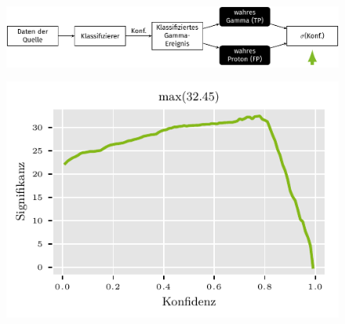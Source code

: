 \documentclass[aspectratio=1610, professionalfonts, 9pt]{beamer}
\begin{document}
\begin{frame}
  \begin{minipage}[t][0.25\textheight][t]{\textwidth}
	\begin{figure}
	  \includegraphics[scale=0.5]{./tikz/Conf/Conf4.pdf}
	\end{figure}
  \end{minipage}
  \begin{minipage}[t][0.75\textheight][t]{\textwidth}
	\begin{figure}
	  \centering
	  \includegraphics[height=0.7\textheight]{./Plots/maxSignificance.pdf}
	\end{figure}
  \end{minipage}
\end{frame}
\end{document}
